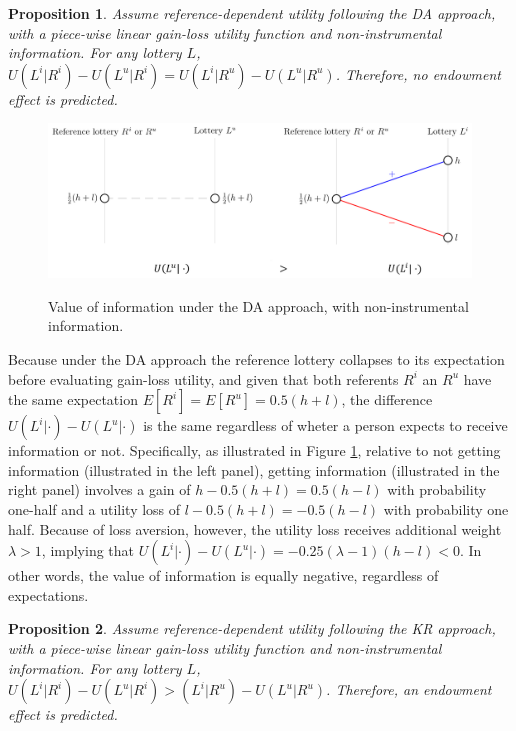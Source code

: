 \documentclass[12pt]{article}
\newtheorem{prop}{Proposition}
\begin{document}
\begin{prop}
  Assume reference-dependent utility following the DA approach, with a piece-wise linear gain-loss utility function and non-instrumental information. For any lottery $L$, $U(L^i|R^i)-U(L^u|R^i)=U(L^i|R^u)-U(L^u|R^u)$. Therefore, no endowment effect is predicted.
  \label{prop:nonInstrumental-DA}
\end{prop}

\begin{figure}[ht]
  \caption{Value of information under the DA approach, with non-instrumental information.}\label{fig:nonInstrumental-DA}
  \begin{center}
  {\includegraphics[width=1\textwidth]{./figures/theory_fig1.png}}
  \end{center}
\end{figure}

Because under the DA approach the reference lottery collapses to its expectation before evaluating gain-loss utility, and given that both referents $R^i$ an $R^u$ have the same expectation $E[R^i]=E[R^u]=0.5(h+l)$, the difference $U(L^i|\cdot)-U(L^u|\cdot)$ is the same regardless of wheter a person expects to receive information or not. Specifically, as illustrated in Figure \ref{fig:nonInstrumental-DA}, relative to not getting information (illustrated in the left panel), getting information (illustrated in the right panel) involves a gain of $h-0.5(h+l)=0.5(h-l)$ with probability one-half and a utility loss of $l-0.5(h+l)=-0.5(h-l)$ with probability one half. Because of loss aversion, however, the utility loss receives additional weight $\lambda>1$, implying that $U(L^i|\cdot)-U(L^u|\cdot)=-0.25(\lambda-1)(h-l)<0$. In other words, the value of information is equally negative, regardless of expectations.

\FloatBarrier

\begin{prop}
  Assume reference-dependent utility following the KR approach, with a piece-wise linear gain-loss utility function and non-instrumental information. For any lottery $L$, $U(L^i|R^i)-U(L^u|R^i)>(L^i|R^u)-U(L^u|R^u)$. Therefore, an endowment effect is predicted.
  \label{prop:nonInstrumental-KR}
\end{prop}
\end{document}
